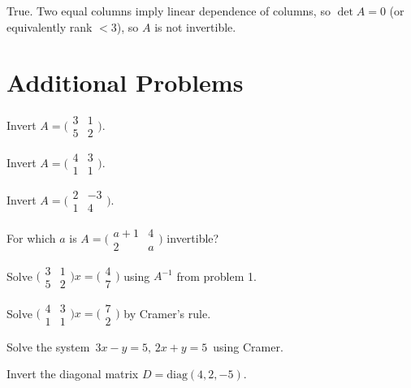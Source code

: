 \begin{solutions}
    \item True. Two equal columns imply linear dependence of columns, so $\det A = 0$ (or equivalently rank $< 3$), so $A$ is not invertible.
\end{solutions}

\section{Additional Problems}

\begin{problems}
    \item Invert $A = \bigl(\begin{smallmatrix} 3 & 1 \\ 5 & 2 \end{smallmatrix}\bigr)$.
    \item Invert $A = \bigl(\begin{smallmatrix} 4 & 3 \\ 1 & 1 \end{smallmatrix}\bigr)$.
    \item Invert $A = \bigl(\begin{smallmatrix} 2 & -3 \\ 1 & 4 \end{smallmatrix}\bigr)$.
    \item For which $a$ is $A = \bigl(\begin{smallmatrix} a+1 & 4 \\ 2 & a \end{smallmatrix}\bigr)$ invertible?
    \item Solve $\bigl(\begin{smallmatrix} 3 & 1 \\ 5 & 2 \end{smallmatrix}\bigr) x = \bigl(\begin{smallmatrix} 4 \\ 7 \end{smallmatrix}\bigr)$ using $A^{-1}$ from problem 1.
    \item Solve $\bigl(\begin{smallmatrix} 4 & 3 \\ 1 & 1 \end{smallmatrix}\bigr) x = \bigl(\begin{smallmatrix} 7 \\ 2 \end{smallmatrix}\bigr)$ by Cramer's rule.
    \item Solve the system $\,3x - y = 5,\, 2x + y = 5\,$ using Cramer.
    \item Invert the diagonal matrix $D = \mathrm{diag}(4, 2, -5)$.

\end{problems}
